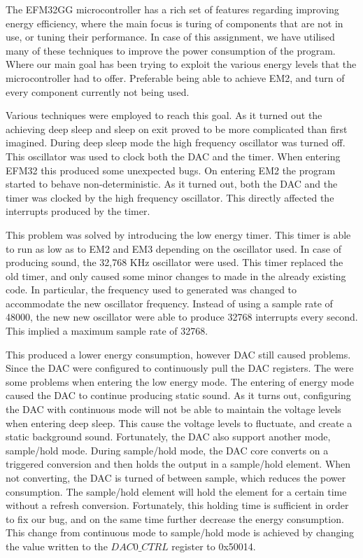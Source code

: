 The EFM32GG microcontroller has a rich set of features regarding improving energy efficiency, where the main focus is turing of components that are not in use, or tuning their performance. In case of this assignment, we have utilised many of these techniques to improve the power consumption of the program. Where our main goal has been trying to exploit the various energy levels that the microcontroller had to offer. Preferable being able to achieve EM2, and turn of every component currently not being used. 

Various techniques were employed to reach this goal. As it turned out the achieving deep sleep and sleep on exit proved to be more complicated than first imagined. During deep sleep mode the high frequency oscillator was turned off. This oscillator was used to clock both the DAC and the timer. When entering EFM32 this produced some unexpected bugs. On entering EM2 the program started to behave non-deterministic. As it turned out, both the DAC and the timer was clocked by the high frequency oscillator. This directly affected the interrupts produced by the timer.

This problem was solved by introducing the low energy timer. This timer is able to run as low as to EM2 and EM3 depending on the oscillator used. In case of producing sound, the 32,768 KHz oscillator were used. This timer replaced the old timer, and only caused some minor changes to made in the already existing code. In particular, the frequency used to generated was changed to accommodate the new oscillator frequency. Instead of  using a sample rate of 48000, the new 
new oscillator were able to produce 32768 interrupts every second. This implied a maximum sample rate of 32768.


This produced a lower energy consumption, however DAC still caused problems. Since the DAC were configured to continuously pull the DAC registers. The were some problems when entering the low energy mode. The entering of energy mode caused the DAC to continue producing static sound. As it turns out, configuring the DAC with continuous mode will not be able to maintain the voltage levels when entering deep sleep. This cause the voltage levels to fluctuate, and create a static background sound. Fortunately, the DAC also support another mode, sample/hold mode. During sample/hold mode, the DAC core converts on a triggered conversion and then holds the output in a sample/hold element. When not converting, the DAC is turned of between sample, which reduces the power consumption. The sample/hold element will hold the element for a certain time without a refresh conversion\cite{EFM32GG-rm}. Fortunately, this holding time is sufficient in order to fix our bug, and on the same time further decrease the energy consumption. This change from continuous mode to sample/hold mode is achieved by changing the value written to the $DAC0\_CTRL$ register to 0x50014. 


